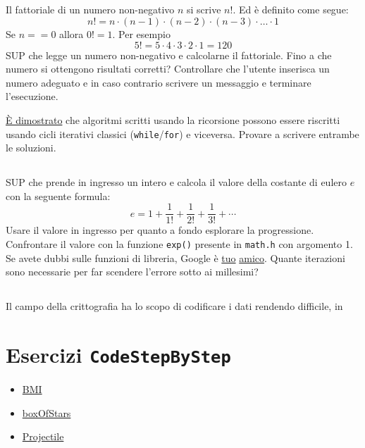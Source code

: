 \documentclass{article}
\begin{document}
\subsection{}
Il fattoriale di un numero non-negativo $n$ si scrive $n!$. Ed è definito come segue:
$$n! = n \cdot (n - 1) \cdot (n - 2) \cdot (n - 3) \cdot \ldots \cdot 1$$
Se $n==0$ allora $0! = 1$.
Per esempio $$5! = 5 \cdot 4 \cdot 3 \cdot 2 \cdot 1 = 120$$
SUP che legge un numero non-negativo e calcolarne il fattoriale. Fino a che numero si ottengono risultati corretti? Controllare che l'utente inserisca un numero adeguato e in caso contrario scrivere un messaggio e terminare l'esecuzione. 
\begin{info} 
	\href{https://en.wikipedia.org/wiki/Recursion_(computer_science)#Recursion_versus_iteration}{È dimostrato} che algoritmi scritti usando la ricorsione possono essere riscritti usando cicli iterativi classici (\texttt{while}/\texttt{for}) e viceversa. Provare a scrivere entrambe le soluzioni.
\end{info}


\subsection{}
SUP che prende in ingresso un intero e calcola il valore della costante di eulero $e$ con la seguente formula:
$$e = 1 + \frac{1}{1!} + \frac{1}{2!} + \frac{1}{3!} + \cdots$$
Usare il valore in ingresso per quanto a fondo esplorare la progressione. Confrontare il valore con la funzione \texttt{exp()} presente in \texttt{math.h} con argomento 1. Se avete dubbi sulle funzioni di libreria, Google è \href{http://www.cplusplus.com/reference/cmath/exp/}{tuo} \href{https://www.geeksforgeeks.org/exp-function-cpp/}{amico}. Quante iterazioni sono necessarie per far scendere l'errore sotto ai millesimi?

\subsection{}
Il campo della crittografia ha lo scopo di codificare i dati rendendo difficile, in






\section*{Esercizi \texttt{CodeStepByStep}}
\begin{itemize}
	\item \href{https://www.codestepbystep.com/problem/view/cpp/parameters/BMI}{BMI}
	\item \href{https://www.codestepbystep.com/problem/view/cpp/parameters/boxOfStars}{boxOfStars}
	\item \href{https://www.codestepbystep.com/problem/view/cpp/parameters/Projectile}{Projectile}
\end{itemize}
\end{document}
